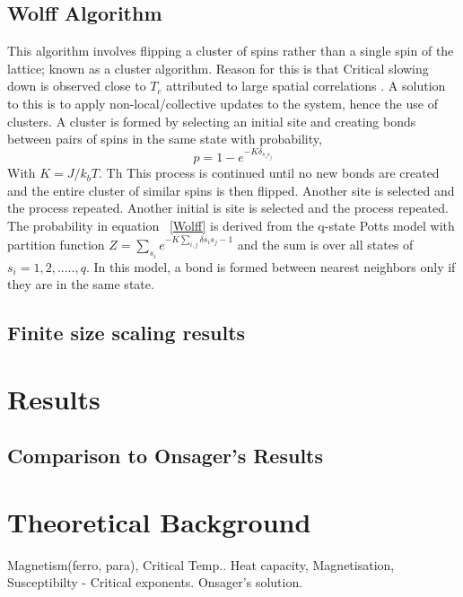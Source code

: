 \documentclass[12pt]{article}
\begin{document}
\subsection{Wolff Algorithm}
This algorithm involves flipping a cluster of spins rather than a single spin of the lattice; known as a cluster algorithm.
Reason for this is that Critical slowing down is observed close to $T_c$  attributed to large spatial correlations \cite{Leipzig}. A solution to this is to apply non-local/collective updates to the system, hence the use of clusters.
 A cluster is formed by selecting an initial site and  creating bonds between pairs of spins in the same state with probability,
 \begin{equation}\label{Wolff}
 p = 1 - e^{-K\delta_{s_is_j}}
 \end{equation}
 With $K = J/k_bT$.
 Th
 This process is continued until no new bonds are created and the entire cluster of similar spins is then flipped. Another site is selected and the process repeated.
Another initial is site is selected and the process repeated. 
The probability in equation ~\ref{Wolff} is derived from the q-state Potts model \cite{Landau} with partition function $ Z  = \sum_{s_i} e^{-K\sum_{i,j}\delta s_is_j -1} $ and the sum is over all states of $s_i = 1,2,.....,q.$
In this model, a bond is formed between nearest neighbors only if they are in the same state.

\subsection{Finite size scaling results}
\section{Results}

\subsection{Comparison to Onsager's Results}


\section{Theoretical Background}
Magnetism(ferro, para), 
Critical Temp..
Heat capacity, Magnetisation, Susceptibilty - Critical exponents.
Onsager's solution.
\end{document}
